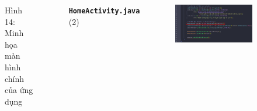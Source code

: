 \documentclass{beamer}
\begin{document}
\begin{frame}
\begin{columns}
\begin{figure}
            \caption{\centering\tiny{Hình 14: Minh họa màn hình chính của ứng dụng}}
        \end{figure}
        \indent \textbf{\texttt{HomeActivity.java}} (2)
        \begin{figure}
            \centering
            \includegraphics[width=\textwidth]{images/23.png}
        \end{figure}
    \end{columns}
\end{frame}
\end{document}
